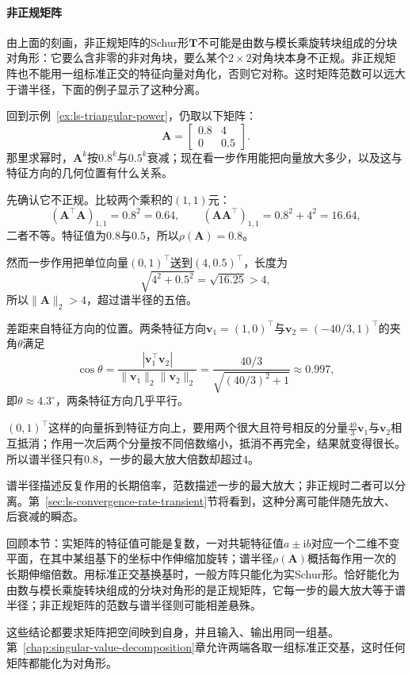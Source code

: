 \paragraph{非正规矩阵}
由上面的刻画，非正规矩阵的Schur形$\bm T$不可能是由数与模长乘旋转块组成的分块对角形：它要么含非零的非对角块，要么某个$2\times2$对角块本身不正规。非正规矩阵也不能用一组标准正交的特征向量对角化，否则它对称。这时矩阵范数可以远大于谱半径，下面的例子显示了这种分离。
\begin{example}[非正规矩阵的范数与谱半径]
\label{ex:ls-nonnormal-norm-radius}
回到示例~\ref{ex:ls-triangular-power}，仍取以下矩阵：
\[
 \bm A=\begin{bmatrix}0.8&4\\0&0.5\end{bmatrix}.
\]
那里求幂时，$\bm A^k$按$0.8^k$与$0.5^k$衰减；现在看一步作用能把向量放大多少，以及这与特征方向的几何位置有什么关系。

先确认它不正规。比较两个乘积的$(1,1)$元：
\[
 (\bm A^\top\bm A)_{1,1}=0.8^2=0.64,\qquad(\bm A\bm A^\top)_{1,1}=0.8^2+4^2=16.64,
\]
二者不等。特征值为$0.8$与$0.5$，所以$\rho(\bm A)=0.8$。

然而一步作用把单位向量$(0,1)^\top$送到$(4,0.5)^\top$，长度为
\[
 \sqrt{4^2+0.5^2}=\sqrt{16.25}>4,
\]
所以$\lVert\bm A\rVert_2>4$，超过谱半径的五倍。

差距来自特征方向的位置。两条特征方向$\bm v_1=(1,0)^\top$与$\bm v_2=(-40/3,1)^\top$的夹角$\theta$满足
\[
 \cos\theta=\frac{|\bm v_1^\top\bm v_2|}{\lVert\bm v_1\rVert_2\lVert\bm v_2\rVert_2}
 =\frac{40/3}{\sqrt{(40/3)^2+1}}\approx0.997,
\]
即$\theta\approx4.3^\circ$，两条特征方向几乎平行。

$(0,1)^\top$这样的向量拆到特征方向上，要用两个很大且符号相反的分量$\tfrac{40}{3}\bm v_1$与$\bm v_2$相互抵消；作用一次后两个分量按不同倍数缩小，抵消不再完全，结果就变得很长。所以谱半径只有$0.8$，一步的最大放大倍数却超过$4$。
\end{example}
谱半径描述反复作用的长期倍率，范数描述一步的最大放大；非正规时二者可以分离。第~\ref{sec:ls-convergence-rate-transient}节将看到，这种分离可能伴随先放大、后衰减的瞬态。

回顾本节：实矩阵的特征值可能是复数，一对共轭特征值$a\pm\mathrm ib$对应一个二维不变平面，在其中某组基下的坐标中作伸缩加旋转；谱半径$\rho(\bm A)$概括每作用一次的长期伸缩倍数。用标准正交基换基时，一般方阵只能化为实Schur形。恰好能化为由数与模长乘旋转块组成的分块对角形的是正规矩阵，它每一步的最大放大等于谱半径；非正规矩阵的范数与谱半径则可能相差悬殊。

这些结论都要求矩阵把空间映到自身，并且输入、输出用同一组基。第~\ref{chap:singular-value-decomposition}章允许两端各取一组标准正交基，这时任何矩阵都能化为对角形。
